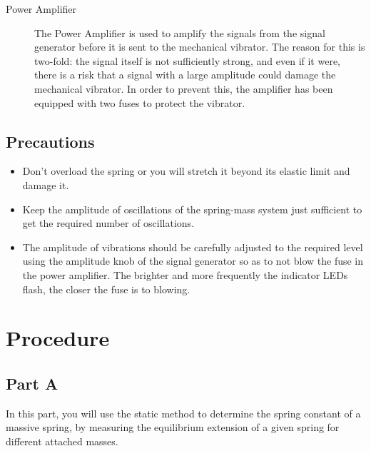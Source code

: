 \begin{description}
\item[Power Amplifier]

The Power Amplifier is used to amplify the signals from the signal generator before it is sent to the mechanical vibrator. The reason for this is two-fold: the signal itself is not sufficiently strong, and even if it were, there is a risk that a signal with a large amplitude could damage the mechanical vibrator. In order to prevent this, the amplifier has been equipped with two fuses to protect the vibrator.

\end{description}





\subsection*{Precautions}

\begin{itemize}
\item Don't overload the spring or you will stretch it beyond its elastic limit and damage it.
\item Keep the amplitude of oscillations of the spring-mass system just sufficient to get the required number of oscillations.
\item The amplitude of vibrations should be carefully adjusted to the required level using the amplitude knob of the signal generator so as to not blow the fuse in the power amplifier. The brighter and more frequently the indicator LEDs flash, the closer the fuse is to blowing.
\end{itemize}

\section*{Procedure}

\subsection*{Part A}

In this part, you will use the static method to determine the spring constant of a massive spring, by measuring the equilibrium extension of a given spring for different attached masses.

